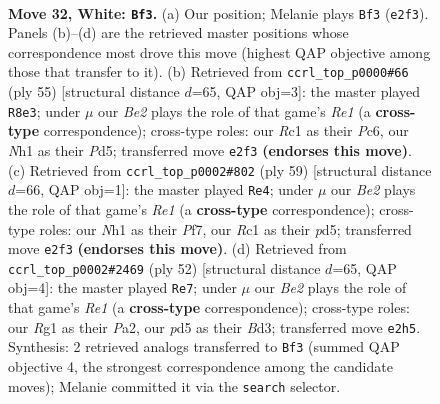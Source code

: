 \documentclass[11pt]{article}
\begin{document}
\clearpage

\begin{figure}[p]\centering
\begin{subfigure}{0.46\textwidth}\centering
\resizebox{\linewidth}{!}{%
\newchessgame
\chessboard[
  setfen={r4k1r/1p3p1p/4b1p1/p2p4/5P2/3K4/PP2B1PP/2R3RN w - - 5 32},
  showmover=false,
  pgfstyle=straightmove, color=movearrow, markmove={e2-f3}
]}
\caption{}
\end{subfigure}\hfill
\begin{subfigure}{0.46\textwidth}\centering
\resizebox{\linewidth}{!}{%
\newchessgame
\chessboard[
  setfen={4r1k1/5p2/2p2p2/R1Pp3p/5Pb1/3B4/PPK2R1P/4r3 b - - 2 28},
  showmover=false,
  pgfstyle=straightmove, color=movearrow, markmove={e8-e3}
]}
\caption{}
\end{subfigure}
\\[4pt]
\begin{subfigure}{0.46\textwidth}\centering
\resizebox{\linewidth}{!}{%
\newchessgame
\chessboard[
  setfen={3rr3/kp3p1p/3p4/3P1p2/p4P2/3R2P1/PP5P/1K5R b - - 0 30},
  showmover=false,
  pgfstyle=straightmove, color=movearrow, markmove={e8-e4}
]}
\caption{}
\end{subfigure}\hfill
\begin{subfigure}{0.46\textwidth}\centering
\resizebox{\linewidth}{!}{%
\newchessgame
\chessboard[
  setfen={7r/1p1n4/1k1r3p/p5p1/3p4/3B2P1/PP3PP1/3RRK2 w - - 0 27},
  showmover=false,
  pgfstyle=straightmove, color=movearrow, markmove={e1-e7}
]}
\caption{}
\end{subfigure}
\caption{\textbf{Move 32, White: \texttt{Bf3}.} (a) Our position; Melanie plays \texttt{Bf3} (\texttt{e2f3}). Panels (b)--(d) are the retrieved master positions whose correspondence most drove this move (highest QAP objective among those that transfer to it). (b) Retrieved from \texttt{ccrl\_top\_p0000\#66} (ply 55) [structural distance $d$=65, QAP obj=3]: the master played \texttt{R8e3}; under $\mu$ our \emph{Be2} plays the role of that game's \emph{Re1} (a \textbf{cross-type} correspondence); cross-type roles: our \emph{R}c1 as their \emph{P}c6, our \emph{N}h1 as their \emph{P}d5; transferred move \texttt{e2f3} \textbf{(endorses this move)}. (c) Retrieved from \texttt{ccrl\_top\_p0002\#802} (ply 59) [structural distance $d$=66, QAP obj=1]: the master played \texttt{Re4}; under $\mu$ our \emph{Be2} plays the role of that game's \emph{Re1} (a \textbf{cross-type} correspondence); cross-type roles: our \emph{N}h1 as their \emph{P}f7, our \emph{R}c1 as their \emph{p}d5; transferred move \texttt{e2f3} \textbf{(endorses this move)}. (d) Retrieved from \texttt{ccrl\_top\_p0002\#2469} (ply 52) [structural distance $d$=65, QAP obj=4]: the master played \texttt{Re7}; under $\mu$ our \emph{Be2} plays the role of that game's \emph{Re1} (a \textbf{cross-type} correspondence); cross-type roles: our \emph{R}g1 as their \emph{P}a2, our \emph{p}d5 as their \emph{B}d3; transferred move \texttt{e2h5}. Synthesis: 2 retrieved analogs transferred to \texttt{Bf3} (summed QAP objective 4, the strongest correspondence among the candidate moves); Melanie committed it via the \texttt{search} selector.}
\label{fig:thought-m62}
\end{figure}
\end{document}
